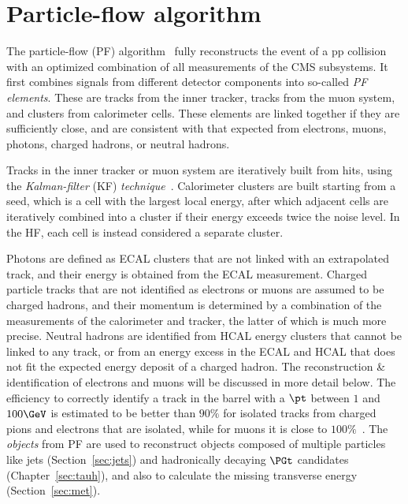 \section{Particle-flow algorithm} \label{sec:PF}
The particle-flow (PF) algorithm~\cite{PF1,PF2017} fully reconstructs the event of a pp collision with an optimized combination of all measurements of the CMS subsystems. %
It first combines signals from different detector components into so-called \emph{PF elements}. These are tracks from the inner tracker, tracks from the muon system, and clusters from calorimeter cells.
These elements are linked together if they are sufficiently close, and are consistent with that expected from electrons, muons, photons, charged hadrons, or neutral hadrons.

Tracks in the inner tracker or muon system are iteratively built from hits, using the \emph{Kalman-filter} (KF) \emph{technique}~\cite{CMS_track_reco_2006,Kalman_filtering}.
Calorimeter clusters are built starting from a seed, which is a cell with the largest local energy, after which adjacent cells are iteratively combined into a cluster if their energy exceeds twice the noise level. In the HF, each cell is instead considered a separate cluster.

Photons are defined as ECAL clusters that are not linked with an extrapolated track, and their energy is obtained from the ECAL measurement.
Charged particle tracks that are not identified as electrons or muons are assumed to be charged hadrons, and their momentum is determined by a combination of the measurements of the calorimeter and tracker, the latter of which is much more precise.
Neutral hadrons are identified from HCAL energy clusters that cannot be linked to any track, or from an energy excess in the ECAL and HCAL that does not fit the expected energy deposit of a charged hadron.
The reconstruction \& identification of electrons and muons will be discussed in more detail below.
The efficiency to correctly identify a track in the barrel with a $\pt$ between $1$ and $100\GeV$ is estimated to be better than $90\%$ for isolated tracks from charged pions and electrons that are isolated, while for muons it is close to $100\%$~\cite{CMS_vertex}.
The \emph{objects} from PF are used to reconstruct objects composed of multiple particles like jets (Section~\ref{sec:jets}) and hadronically decaying $\PGt$ candidates (Chapter~\ref{sec:tauh}), and also to calculate the missing transverse energy (Section~\ref{sec:met}).


